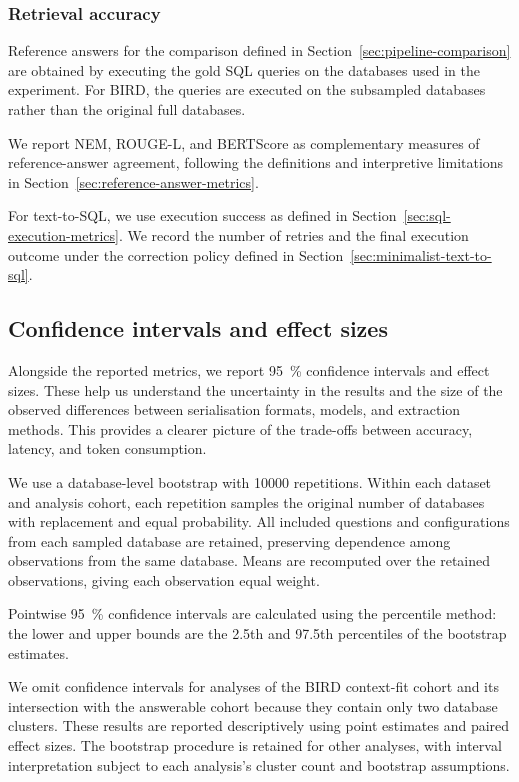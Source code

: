 \subsubsection{Retrieval accuracy}

Reference answers for the comparison defined in Section~\ref{sec:pipeline-comparison} are obtained by
executing the gold SQL queries on the databases used in the experiment. For BIRD, the queries are executed on
the subsampled databases rather than the original full databases.

We report NEM, ROUGE-L, and BERTScore as complementary measures of reference-answer agreement, following the
definitions and interpretive limitations in Section~\ref{sec:reference-answer-metrics}.

For text-to-SQL, we use execution success as defined in Section~\ref{sec:sql-execution-metrics}. We record
the number of retries and the final execution outcome under the correction policy defined in
Section~\ref{sec:minimalist-text-to-sql}.

\subsection{Confidence intervals and effect sizes} \label{sec:confidence-intervals}

Alongside the reported metrics, we report \qty{95}{\percent} confidence intervals and effect sizes. These
help us understand the uncertainty in the results and the size of the observed differences between
serialisation formats, models, and extraction methods. This provides a clearer picture of the trade-offs
between accuracy, latency, and token consumption.

We use a database-level bootstrap with \num{10000} repetitions. Within each dataset and analysis cohort, each
repetition samples the original number of databases with replacement and equal probability. All included
questions and configurations from each sampled database are retained, preserving dependence among
observations from the same database. Means are recomputed over the retained observations, giving each
observation equal weight.

Pointwise \qty{95}{\percent} confidence intervals are calculated using the percentile method: the lower and
upper bounds are the \num{2.5}th and \num{97.5}th percentiles of the bootstrap estimates.

We omit confidence intervals for analyses of the BIRD context-fit cohort and its intersection with the
answerable cohort because they contain only two database clusters. These results are reported descriptively
using point estimates and paired effect sizes. The bootstrap procedure is retained for other analyses,
with interval interpretation subject to each analysis's cluster count and bootstrap assumptions.

